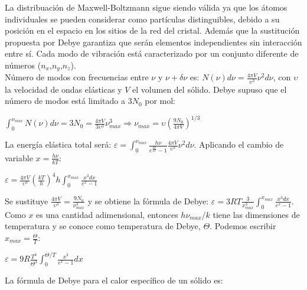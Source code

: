 \documentclass[oneside]{book}
\numberwithin{equation}{section}
\numberwithin{figure}{section}
\numberwithin{table}{section}
\begin{document}
\begin{itemize}
				La distribuación de Maxwell-Boltzmann sigue siendo válida ya que los átomos individuales se pueden considerar como partículas distinguibles, debido a su posición en el espacio en los sitios de la red del cristal. Además que la sustitución propuesta por Debye garantiza que serán elementos independientes sin interacción entre sí. Cada modo de vibración está caracterizado por un conjunto diferente de números ($n_x$,$n_y$,$n_z$).\\
			
				Número de modos con frecuencias entre $\nu$ y $\nu+\delta \nu$ es: $\displaystyle N(\nu)d\nu=\frac{4\pi V}{\upsilon^3}\nu^2d\nu$, con $\upsilon$ la velocidad de ondas elásticas y $V$ el volumen del sólido. Debye supuso que el número de modos está limitado a $3 N_0$ por mol:\\
			
				\begin{center}
					$\displaystyle \int_0^{\nu_{max}} N(\nu)d\nu=3 N_0=\frac{4\pi V}{3\upsilon^3} \nu_{max}^3 \Rightarrow \nu_{max}=\upsilon\left(\frac{9 N_0}{4\pi V} \right)^{1/3}$
				\end{center}
		
				La energía elástica total será: $\displaystyle \varepsilon=\int_0^{\nu_{max}}\frac{h\nu}{e^{\frac{h\nu}{kT}}-1}\frac{4\pi V}{\upsilon^3}\nu^2 d\nu$. Aplicando el cambio de variable $x=\frac{h\nu}{kT}$:\\
		
				\begin{center}
					$\displaystyle \varepsilon=\frac{4\pi V}{\upsilon^3}\left(\frac{kT}{h}\right)^4 h \int_0^{x_{max}}\frac{x^3dx}{e^x-1}$
				\end{center}		
		
				Se sustituye $\displaystyle \frac{4\pi V}{\upsilon^3}=\frac{9 N_0}{\nu_{max}^3}$ y se obtiene la fórmula de Debye: $\displaystyle \varepsilon=3RT\frac{3}{x_{max}^3} \int_0^{x_{max}}\frac{x^3dx}{e^x-1}$.\\
		
				Como $x$ es una cantidad adimensional, entonces $h\nu_{max}/k$ tiene las dimensiones de temperatura y se conoce como temperatura de Debye, $\Theta$. Podemos escribir $\displaystyle x_{max}=\frac{\Theta}{T}$:
		
				\begin{center}
					$\displaystyle \varepsilon=9R\frac{T^4}{\Theta^3}\int_0^{\Theta/T} \frac{x^3}{e^x-1}dx$
				\end{center}
		
				La fórmula de Debye para el calor específico de un sólido es:
			

\end{itemize}
\end{document}
